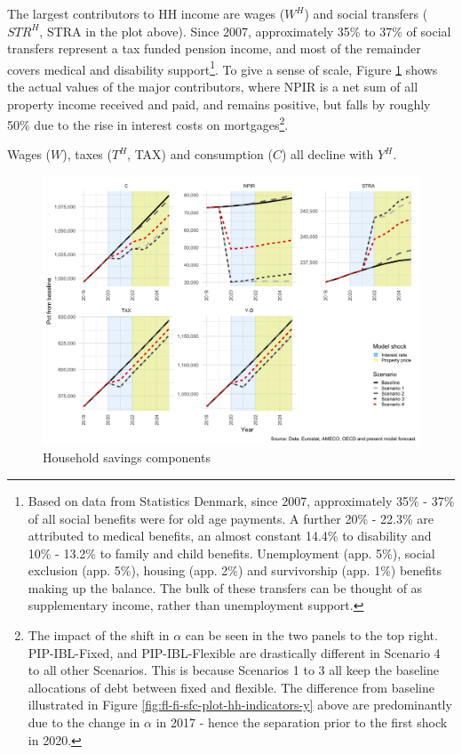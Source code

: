 \documentclass[
]{book}
\begin{document}
The largest contributors to HH income are wages (\(W^H\)) and social transfers (\(STR^H\), STRA in the plot above). Since 2007, approximately 35\% to 37\% of social transfers represent a tax funded pension income, and most of the remainder covers medical and disability support\footnote{Based on data from Statistics Denmark, since 2007, approximately 35\% - 37\% of all social benefits
  were for old age payments. A further 20\% - 22.3\% are attributed to medical benefits, an almost
  constant 14.4\% to disability and 10\% - 13.2\% to family and child benefits. Unemployment (app. 5\%),
  social exclusion (app. 5\%), housing (app. 2\%) and survivorship (app. 1\%) benefits making up the balance. The bulk of these transfers can be thought of as supplementary income, rather than unemployment support.}. To give a sense of scale, Figure \ref{fig:fl-fi-sfc-plot-hh-indicators-npir} shows the actual values of the major contributors, where NPIR is a net sum of all property income received and paid, and remains positive, but falls by roughly 50\% due to the rise in interest costs on mortgages\footnote{The impact of the shift in \(\alpha\) can be seen in the two panels to the top right. PIP-IBL-Fixed, and PIP-IBL-Flexible are drastically different in Scenario 4 to all other Scenarios. This is because Scenarios 1 to 3 all keep the baseline allocations of debt between fixed and flexible. The difference from baseline illustrated in Figure \ref{fig:fl-fi-sfc-plot-hh-indicators-y} above are predominantly due to the change in \(\alpha\) in 2017 - hence the separation prior to the first shock in 2020.}.

Wages (\(W\)), taxes (\(T^H\), TAX) and consumption (\(C\)) all decline with \(Y^H\).

\begin{figure}[H]
\includegraphics[width=0.95\linewidth]{figures/fl-fi-sfc-plot-hh-indicators-npir-1} \caption{Household savings components}\label{fig:fl-fi-sfc-plot-hh-indicators-npir}
\end{figure}
\end{document}
